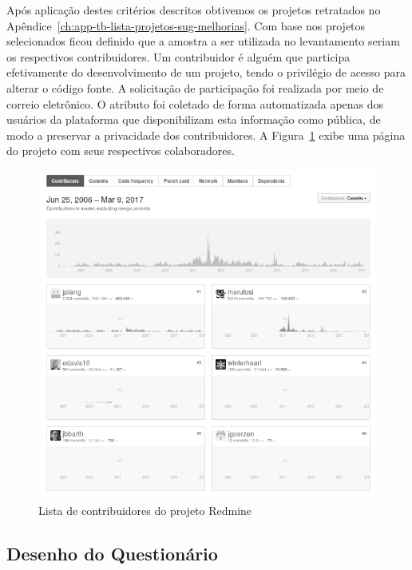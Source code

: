 Após aplicação destes critérios descritos obtivemos os projetos retratados no
Apêndice~\ref{ch:app-tb-lista-projetos-sug-melhorias}. Com base nos projetos
selecionados ficou definido que a amostra a ser utilizada no levantamento
seriam os respectivos contribuidores. Um contribuidor é alguém que participa
efetivamente do desenvolvimento de um projeto, tendo o privilégio de acesso
para alterar o código fonte. A solicitação de participação foi realizada por
meio de correio eletrônico. O atributo foi coletado de forma automatizada
apenas dos usuários da plataforma que disponibilizam esta informação como
pública, de modo a preservar a privacidade dos contribuidores. A
Figura~\ref{fig:redmine_contribuidores} exibe uma página do projeto com seus
respectivos colaboradores.

\begin{figure}[htpb]
	\centering
	\includegraphics[width=0.8\linewidth]{./chapter-sugestoes-melhorias-fgrm/img/redmine_contribuidores.png}
	\caption{Lista de contribuidores do projeto Redmine}\label{fig:redmine_contribuidores}
\end{figure}

\subsection{Desenho do Questionário}\label{ssub:sug_melhoria_desenho_questionario}

